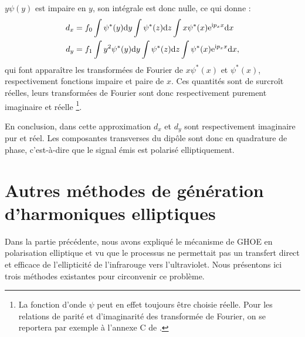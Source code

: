 $y\psi(y)$ est impaire en $y$, son intégrale est donc nulle, ce qui donne :
\begin{align}
d_x &= f_0\int{\psi^*(y)\mathrm{d}y}\int{\psi^*(z)\mathrm{d}z}\int{x\psi^*(x)\mathrm{e}^{\mathrm{i}p_x x}\mathrm{d}x}\nonumber\\
d_y &= f_1\int{y^2 \psi^*(y)\mathrm{d}y}\int{\psi^*(z)\mathrm{d}z}\int{\psi^*(x)\mathrm{e}^{\mathrm{i}p_x x}\mathrm{d}x},
\end{align}
qui font apparaître les transformées de Fourier de $x\psi^*(x)$ et $\psi^*(x)$, respectivement fonctions impaire et paire de $x$. Ces quantités sont de surcroît réelles, leurs transformées de Fourier sont donc respectivement purement imaginaire et réelle \footnote{La fonction d'onde $\psi$ peut en effet toujours être choisie réelle. Pour les relations de parité et d'imaginarité des transformée de Fourier, on se reportera par exemple à l'annexe C de .}.

En conclusion, dans cette approximation $d_x$ et $d_y$ sont respectivement imaginaire pur et réel. Les composantes transverses du dipôle sont donc en quadrature de phase, c'est-à-dire que le signal émis est polarisé elliptiquement.

\section{Autres méthodes de génération d'harmoniques elliptiques}
Dans la partie précédente, nous avons expliqué le mécanisme de GHOE en polarisation elliptique et vu que le processus ne permettait pas un transfert direct et efficace de l'ellipticité de l'infrarouge vers l'ultraviolet. Nous présentons ici trois méthodes existantes pour circonvenir ce problème. 

